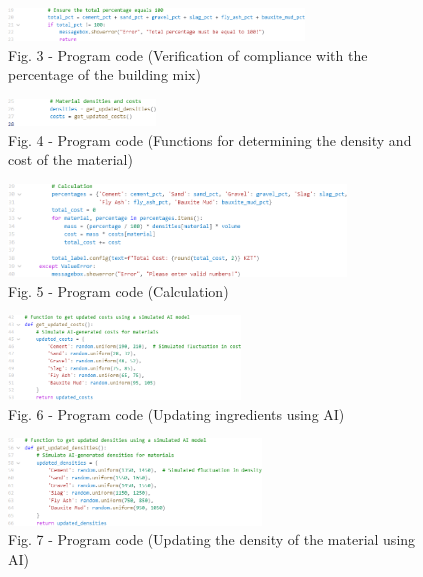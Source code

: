 \begin{figure}[H]
	\includegraphics[width=0.7\textwidth]{media/ict3/image4}
	\caption*{Fig. 3 - Program code (Verification of compliance with the percentage of the building mix)}
\end{figure}

\begin{figure}[H]
	\includegraphics[width=0.35\textwidth]{media/ict3/image5}
	\caption*{Fig. 4 - Program code (Functions for determining the density and cost of the material)}
\end{figure}

\begin{figure}[H]
	\includegraphics[width=0.8\textwidth]{media/ict3/image6}
	\caption*{Fig. 5 - Program code (Calculation)}
\end{figure}

\begin{figure}[H]
	\includegraphics[width=0.55\textwidth]{media/ict3/image7}
	\caption*{Fig. 6 - Program code (Updating ingredients using AI)}
\end{figure}

\begin{figure}[H]
	\includegraphics[width=0.6\textwidth]{media/ict3/image8}
	\caption*{Fig. 7 - Program code (Updating the density of the material using AI)}
\end{figure}

